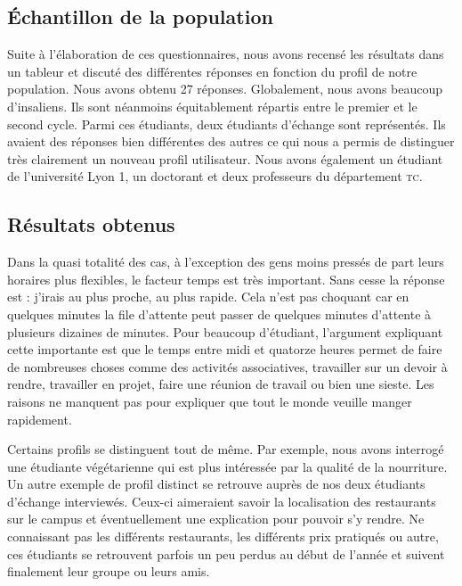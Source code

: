 \subsection{Échantillon de la population}
Suite à l'élaboration de ces questionnaires, nous avons recensé 
les résultats dans un tableur et discuté des différentes réponses en 
fonction du profil de notre population. Nous avons obtenu 27 réponses. 
Globalement, nous avons beaucoup d'insaliens. Ils sont néanmoins équitablement répartis
entre le premier et le second cycle. Parmi ces étudiants, deux
étudiants d'échange sont représentés. Ils avaient des réponses bien
différentes des autres ce qui nous a permis de distinguer très clairement un nouveau profil
utilisateur. Nous avons également un étudiant de l'université Lyon 1,
un doctorant et deux professeurs du département \textsc{tc}. 

\subsection{Résultats obtenus}
Dans la quasi totalité des cas, à l'exception des gens moins pressés 
de part leurs horaires plus flexibles, le facteur temps est très important.
Sans cesse la réponse est : j'irais au plus proche, au plus rapide. Cela
n'est pas choquant car en quelques minutes la file
d'attente peut passer de quelques minutes d'attente à plusieurs
dizaines de minutes. Pour beaucoup d'étudiant, l'argument expliquant cette
importante est que le temps entre midi et quatorze heures permet de faire de
nombreuses choses comme des activités associatives, travailler sur un devoir à rendre,
travailler en projet, faire une réunion de travail ou bien une sieste. Les raisons ne manquent pas 
pour expliquer que tout le monde veuille manger rapidement. 

Certains profils se distinguent tout de même. Par exemple, nous avons interrogé 
une étudiante végétarienne qui est plus intéressée par la qualité de la nourriture.
Un autre exemple de profil distinct se retrouve auprès de nos deux étudiants d'échange interviewés.
Ceux-ci aimeraient savoir la localisation des restaurants sur le campus et éventuellement une
explication pour pouvoir s'y rendre. Ne connaissant pas les différents restaurants, les
différents prix pratiqués ou autre, ces étudiants se retrouvent parfois un peu perdus au
début de l'année et suivent finalement leur groupe ou leurs amis.\\

